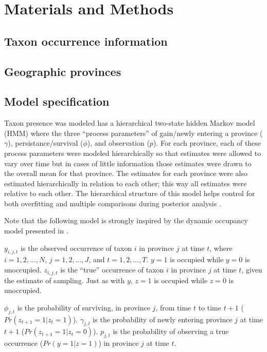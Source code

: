 \documentclass[12pt,letterpaper]{article}
\begin{document}
\section{Materials and Methods}

\subsection{Taxon occurrence information}

\subsection{Geographic provinces}

\subsection{Model specification}
Taxon presence was modeled has a hierarchical two-state hidden Markov model (HMM) where the three ``process parameters'' of gain/newly entering a province (\(\gamma\)), persistance/survival (\(\phi\)), and observation (\(p\)). For each province, each of these process parameters were modeled hierarchically so that estimates were allowed to vary over time but in cases of little information those estimates were drawn to the overall mean for that province. The estimates for each province were also estimated hierarchically in relation to each other; this way all estimates were relative to each other. The hierarchical structure of this model helps control for both overfitting and multiple comparisons during posterior analysis \citep{Gelman2007,Gelman2013d}. 

Note that the following model is strongly inspired by the dynamic occupancy model presented in \citep{Royle2008}.

\(y_{i, j, t}\) is the observed occurrence of taxon \(i\) in province \(j\) at time \(t\), where \(i = 1, 2, \dots, N\), \(j = 1, 2, \dots, J\), and \(t = 1, 2, \dots, T\). \(y = 1\) is occupied while \(y = 0\) is unoccupied. \(z_{i, j, t}\) is the ``true'' occurrence of taxon \(i\) in province \(j\) at time \(t\), given the estimate of sampling. Just as with \(y\), \(z = 1\) is occupied while \(z = 0\) is unoccupied. 

\(\phi_{j, t}\) is the probability of surviving, in province \(j\), from time \(t\) to time \(t + 1\) (\(Pr(z_{t + 1} = 1 | z_{t} = 1)\)). \(\gamma_{j, t}\) is the probability of newly entering province \(j\) at time \(t + 1\) (\(Pr(z_{t + 1} = 1 | z_{t} = 0)\)). \(p_{j, t}\) is the probability of observing a true occurrence (\(Pr(y = 1 | z = 1)\)) in province \(j\) at time \(t\). 
\end{document}
